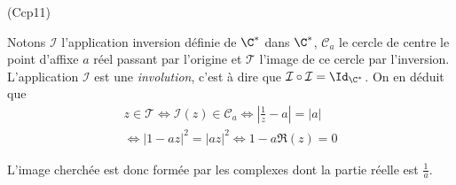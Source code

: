 \begin{tiny}(Ccp11)\end{tiny} \label{Ccp11} Notons $\mathcal{I}$ l'application inversion définie de $\C^*$ dans $\C^*$, $\mathcal{C}_a$ le cercle de centre le point d'affixe $a$ réel passant par l'origine et $\mathcal{T}$ l'image de ce cercle par l'inversion.\newline
L'application $\mathcal{I}$ est une \emph{involution}, c'est à dire que $\mathcal{I} \circ \mathcal{I} = \Id_{\C^*}$. On en déduit que
\begin{multline*}
  z\in \mathcal{T} \Leftrightarrow \mathcal{I}(z) \in \mathcal{C}_a
  \Leftrightarrow \left|\frac{1}{z} - a\right| = |a| \\
  \Leftrightarrow\left|1-az\right|^2 = \left|az\right|^2
  \Leftrightarrow 1-a\Re(z) = 0
\end{multline*}

L'image cherchée est donc formée par les complexes dont la partie réelle est $\frac{1}{a}$.
